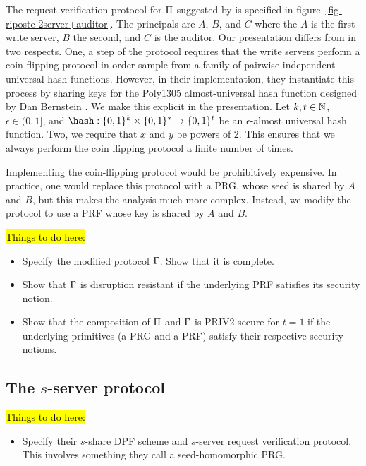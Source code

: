 The request verification protocol for $\mathrm{\Pi}$ suggested by \cite{riposte} is
specified in figure~\ref{fig-riposte-2server+auditor}. The principals are $A$,
$B$, and $C$ where the $A$ is the first write server, $B$ the second, and $C$ is
the auditor.
Our presentation differs from \cite{riposte} in two respects.
One, a step of the protocol requires that the write servers perform a
coin-flipping protocol in order sample from a family of pairwise-independent
universal hash functions.  However, in their implementation, they instantiate
this process by sharing keys for the Poly1305 almost-universal hash function
designed by Dan Bernstein \cite{poly1305}. We make this explicit in the
presentation.  Let $k,t \in \mathbb{N}$, $\epsilon \in (0,1]$, and $\hash : \bits^k \by
\bits^* \to \bits^t$ be an $\epsilon$-almost universal hash function.
Two, we require that $x$ and $y$ be powers of 2. This ensures that we always
perform the coin flipping protocol \cite{telephone} a finite number of times.

Implementing the coin-flipping protocol would be prohibitively expensive. In
practice, one would replace this protocol with a PRG, whose seed is shared by
$A$ and $B$, but this makes the
analysis much more complex. Instead, we modify the protocol to use a PRF whose
key is shared by $A$ and $B$.

\noindent\hl{Things to do here:}
\begin{itemize}
  \item Specify the modified protocol $\mathrm{\Gamma}$. Show that it is complete.

  \item Show that $\mathrm{\Gamma}$ is disruption resistant if the underlying PRF
    satisfies its security notion.

  \item Show that the composition of $\mathrm{\Pi}$ and $\mathrm{\Gamma}$ is PRIV2 secure for
    $t=1$ if the underlying primitives (a PRG and a PRF) satisfy their
    respective security notions.
\end{itemize}

\subsection{The $s$-server protocol}
\noindent\hl{Things to do here:}
\begin{itemize}
  \item Specify their $s$-share DPF scheme and $s$-server request verification
    protocol. This involves something they call a seed-homomorphic PRG.
\end{itemize}
